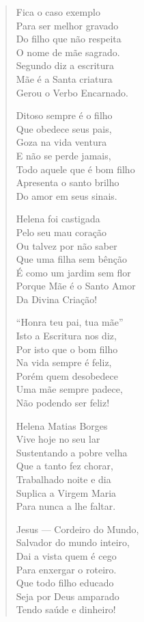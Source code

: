 \begin{verse}
Fica o caso exemplo \\
Para ser melhor gravado \\
Do filho que não respeita \\
O nome de mãe sagrado. \\
Segundo diz a escritura \\
Mãe é a Santa criatura \\
Gerou o Verbo Encarnado. 

Ditoso sempre é o filho \\
Que obedece seus pais, \\
Goza na vida ventura \\
E não se perde jamais, \\
Todo aquele que é bom filho \\
Apresenta o santo brilho \\
Do amor em seus sinais. 

Helena foi castigada \\
Pelo seu mau coração \\
Ou talvez por não saber \\
Que uma filha sem bênção \\
É como um jardim sem flor \\
Porque Mãe é o Santo Amor \\
Da Divina Criação! 


``Honra teu pai, tua mãe'' \\
Isto a Escritura nos diz, \\
Por isto que o bom filho \\
Na vida sempre é feliz, \\
Porém quem desobedece \\
Uma mãe sempre padece, \\
Não podendo ser feliz! 

Helena Matias Borges \\
Vive hoje no seu lar \\
Sustentando a pobre velha \\
Que a tanto fez chorar, \\
Trabalhado noite e dia \\
Suplica a Virgem Maria \\
Para nunca a lhe faltar. 

Jesus --- Cordeiro do Mundo, \\
Salvador do mundo inteiro, \\
Dai a vista quem é cego \\
Para enxergar o roteiro. \\
Que todo filho educado \\
Seja por Deus amparado \\
Tendo saúde e dinheiro! 


\end{verse}
